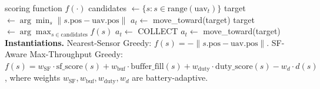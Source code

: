\begin{algorithm}[H]
\caption{One-step greedy policy (scoring-function parameterised).}
\label{alg:greedy}
\begin{algorithmic}[1]
\Require scoring function $f(\cdot)$
  \State candidates $\gets \{s : s \in \text{range}(\text{uav}_t)\}$
    \State target $\gets \arg\min_{s}\|s.\text{pos} - \text{uav}.\text{pos}\|$
    \State $a_t \gets$ move\_toward(target)
  \Else
    \State target $\gets \arg\max_{s \in \text{candidates}} f(s)$
     $a_t \gets$ COLLECT
    \Else{} $a_t \gets$ move\_toward(target)
    \EndIf
  \EndIf
\EndFor
\Statex\textbf{Instantiations.} Nearest-Sensor Greedy:
       $f(s) = -\|s.\text{pos} - \text{uav}.\text{pos}\|$. SF-Aware
       Max-Throughput Greedy:
       $f(s) = w_{\mathrm{SF}}\cdot\text{sf\_score}(s) + w_{\mathrm{buf}}\cdot\text{buffer\_fill}(s) + w_{\mathrm{duty}}\cdot\text{duty\_score}(s) - w_d \cdot d(s)$,
       where weights $w_{\mathrm{SF}}, w_{\mathrm{buf}}, w_{\mathrm{duty}}, w_d$ are battery-adaptive.
\end{algorithmic}
\end{algorithm}

